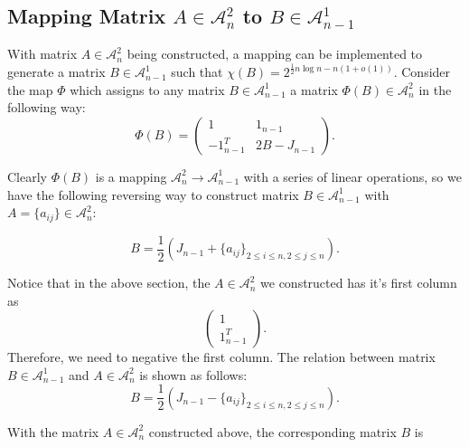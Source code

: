 \documentclass[11pt]{article}
\begin{document}
\subsection{Mapping Matrix $A \in \mathcal{A}_n^2$ to $B \in \mathcal{A}_{n - 1}^1$}
With matrix $A \in \mathcal{A}_n^2$ being constructed, a mapping can be implemented to generate a matrix $B \in \mathcal{A}_{n-1}^{1}$ such that $\chi(B)=2^{\frac{1}{2}n\log n-n(1+o(1))}$\cite{ALON1997133}. Consider the map $\Phi$ which assigns to any matrix $B \in \mathcal{A}_{n - 1}^1$ a matrix $\Phi(B) \in \mathcal{A}_{n}^2$ in the following way:
$$ \Phi(B) = \left(\begin{array}{cc} 
1 & 1_{n-1}\\
-1^T_{n-1} & 2B-J_{n-1}
\end{array}\right).
$$

Clearly $\Phi(B)$ is a mapping $\mathcal{A}_n^2 \to \mathcal{A}_{n - 1}^1$ with a series of linear operations, so we have the following reversing way to construct matrix $B \in \mathcal{A}_{n - 1}^1$ with $A=\{a_{ij}\}\in \mathcal{A}_n^2$:

$$B = \frac{1}{2}(J_{n-1}+\{a_{ij}\}_{2\le i\le n, 2\le j\le n}).$$

Notice that in the above section, the $A \in \mathcal{A}_n^2$ we constructed has it's first column as
$$ \left(\begin{array}{cc} 
1\\
1^T_{n-1}
\end{array}\right).
$$
Therefore,  we need to negative the first column. The relation between matrix $B \in \mathcal{A}_{n - 1}^1$ and $A \in \mathcal{A}_n^2$ is shown as follows:    
$$B = \frac{1}{2}(J_{n-1}-\{a_{ij}\}_{2\le i\le n, 2\le j\le n}).$$

With the matrix $A \in \mathcal{A}_n^2$ constructed above, the corresponding matrix $B$ is 
\end{document}
